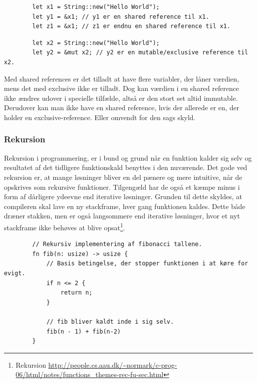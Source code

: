 \documentclass{article}
\begin{document}
\begin{flushleft}
    \begin{verbatim}
        let x1 = String::new("Hello World");
        let y1 = &x1; // y1 er en shared reference til x1.
        let z1 = &x1; // z1 er endnu en shared reference til x1.
    \end{verbatim}

    \begin{verbatim}
        let x2 = String::new("Hello World");
        let y2 = &mut x2; // y2 er en mutable/exclusive reference til x2.

    \end{verbatim}

    Med shared references er det tilladt at have flere variabler, der låner værdien, mens det med exclusive ikke er tilladt.
    Dog kan værdien i en shared reference ikke ændres udover i specielle tilfælde, altså er den stort set altid immutable.
    Derudover kan man ikke have en shared reference, hvis der allerede er en, der holder en exclusive-reference. Eller omvendt for den sags skyld.

    \subsubsection{Rekursion}

    Rekursion i programmering, er i bund og grund når en funktion kalder sig selv
    og resultatet af det tidligere funktionskald benyttes i den nuværende. Det gode ved rekursion er,
    at mange løsninger bliver en del pænere og mere intuitive, når de opskrives som rekursive funktioner.
    Tilgengæld har de også et kæmpe minus i form af dårligere ydeevne end iterative løsninger.
    Grunden til dette skyldes, at compileren skal lave en ny stackframe, hver gang funktionen kaldes.
    Dette både dræner stakken, men er også langsommere end iterative løsninger,
    hvor et nyt stackframe ikke behøves at blive opsat\footnote{Rekursion \url{http://people.cs.aau.dk/~normark/c-prog-06/html/notes/functions_themes-rec-fu-sec.html}}.

    \begin{verbatim}
        // Rekursiv implementering af fibonacci tallene.
        fn fib(n: usize) -> usize {
            // Basis betingelse, der stopper funktionen i at køre for evigt.
            if n <= 2 {
                return n;
            }

            // fib bliver kaldt inde i sig selv.
            fib(n - 1) + fib(n-2)
        }
    \end{verbatim}


\end{flushleft}
\end{document}
